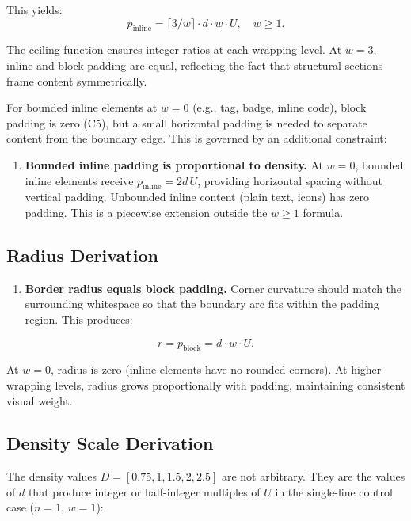 This yields:
\begin{equation}
p_{\text{inline}} = \lceil 3/w \rceil \cdot d \cdot w \cdot U, \quad w \ge 1.
\end{equation}

The ceiling function ensures integer ratios at each wrapping level. At $w = 3$, inline and block padding are equal, reflecting the fact that structural sections frame content symmetrically.

For bounded inline elements at $w = 0$ (e.g., tag, badge, inline code), block padding is zero (C5), but a small horizontal padding is needed to separate content from the boundary edge. This is governed by an additional constraint:

\begin{enumerate}
  \item[\textbf{C7.}] \textbf{Bounded inline padding is proportional to density.}
  At $w = 0$, bounded inline elements receive $p_{\text{inline}} = 2d\,U$, providing horizontal spacing without vertical padding. Unbounded inline content (plain text, icons) has zero padding. This is a piecewise extension outside the $w \ge 1$ formula.
\end{enumerate}

\subsection{Radius Derivation}

\begin{enumerate}
  \item[\textbf{C8.}] \textbf{Border radius equals block padding.}
  Corner curvature should match the surrounding whitespace so that the boundary arc fits within the padding region. This produces:
\end{enumerate}
\begin{equation}
r = p_{\text{block}} = d \cdot w \cdot U.
\end{equation}

At $w = 0$, radius is zero (inline elements have no rounded corners). At higher wrapping levels, radius grows proportionally with padding, maintaining consistent visual weight.

\subsection{Density Scale Derivation}

The density values $D = [0.75, 1, 1.5, 2, 2.5]$ are not arbitrary. They are the values of $d$ that produce integer or half-integer multiples of $U$ in the single-line control case ($n = 1$, $w = 1$):

